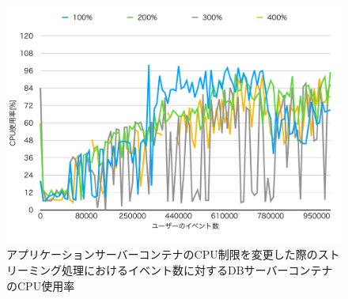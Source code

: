 \documentclass[../../../../../main]{subfiles}
\begin{document}
    \begin{figure}[H]
        \centering
        \includegraphics[width=12cm]{graph}
        \caption{アプリケーションサーバーコンテナのCPU制限を変更した際のストリーミング処理におけるイベント数に対するDBサーバーコンテナのCPU使用率}
        \label{fig:stream-change-cpu-limit-db-cpu-app_1024-db_1_1024}
    \end{figure}
\end{document}

